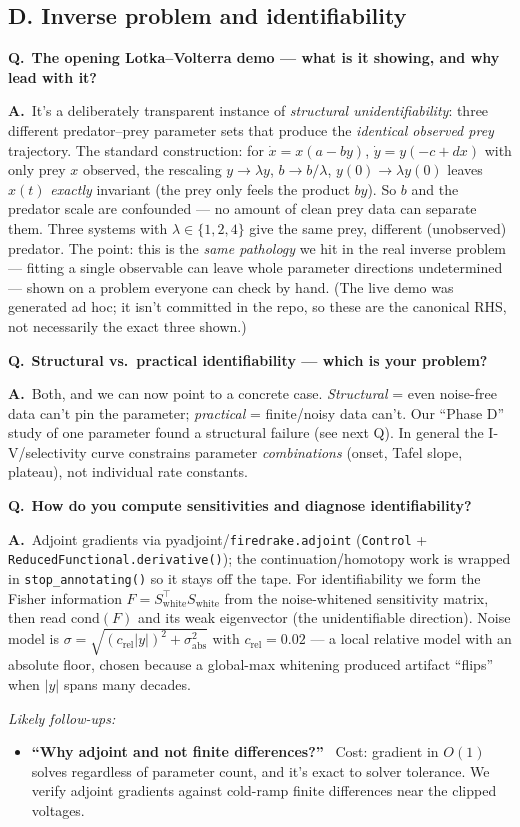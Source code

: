\documentclass[11pt]{article}
\newcommand{\Q}[1]{\medskip\par\noindent\textcolor{qcol}{\textbf{Q.}}\ \textbf{#1}\par\nopagebreak\smallskip}
\newcommand{\A}{\noindent\textbf{A.}\ \ignorespaces}
\newenvironment{followups}{\par\smallskip\noindent\emph{Likely follow-ups:}\begin{itemize}[leftmargin=1.6em,topsep=1pt]}{\end{itemize}}
\newcommand{\fu}[1]{\item \textbf{``#1''}\ }
\begin{document}
\subsection*{D. Inverse problem and identifiability}

\Q{The opening Lotka--Volterra demo --- what is it showing, and why lead with
it?}
\A It's a deliberately transparent instance of \emph{structural
unidentifiability}: three different predator--prey parameter sets that
produce the \emph{identical observed prey} trajectory. The standard
construction: for $\dot x=x(a-by)$, $\dot y=y(-c+dx)$ with only prey $x$
observed, the rescaling $y\to\lambda y$, $b\to b/\lambda$, $y(0)\to\lambda
y(0)$ leaves $x(t)$ \emph{exactly} invariant (the prey only feels the product
$by$). So $b$ and the predator scale are confounded --- no amount of clean
prey data can separate them. Three systems with $\lambda\in\{1,2,4\}$ give
the same prey, different (unobserved) predator. The point: this is the
\emph{same pathology} we hit in the real inverse problem --- fitting a single
observable can leave whole parameter directions undetermined --- shown on a
problem everyone can check by hand. (The live demo was generated ad hoc; it
isn't committed in the repo, so these are the canonical RHS, not necessarily
the exact three shown.)

\Q{Structural vs.\ practical identifiability --- which is your problem?}
\A Both, and we can now point to a concrete case. \emph{Structural} = even
noise-free data can't pin the parameter; \emph{practical} = finite/noisy data
can't. Our ``Phase D'' study of one parameter found a structural failure
(see next Q). In general the I-V/selectivity curve constrains parameter
\emph{combinations} (onset, Tafel slope, plateau), not individual rate
constants.

\Q{How do you compute sensitivities and diagnose identifiability?}
\A Adjoint gradients via pyadjoint/\texttt{firedrake.adjoint}
(\texttt{Control} + \texttt{ReducedFunctional.derivative()}); the
continuation/homotopy work is wrapped in \texttt{stop\_annotating()} so it
stays off the tape. For identifiability we form the Fisher information
$F=S^\top_{\!\mathrm{white}}S_{\mathrm{white}}$ from the noise-whitened
sensitivity matrix, then read $\mathrm{cond}(F)$ and its weak eigenvector
(the unidentifiable direction). Noise model is $\sigma=\sqrt{(c_{\mathrm{rel}}
|y|)^2+\sigma_{\mathrm{abs}}^2}$ with $c_{\mathrm{rel}}=0.02$ --- a local
relative model with an absolute floor, chosen because a global-max whitening
produced artifact ``flips'' when $|y|$ spans many decades.
\begin{followups}
\fu{Why adjoint and not finite differences?} Cost: gradient in $O(1)$
solves regardless of parameter count, and it's exact to solver tolerance. We
verify adjoint gradients against cold-ramp finite differences near the
clipped voltages.
\end{followups}
\end{document}
